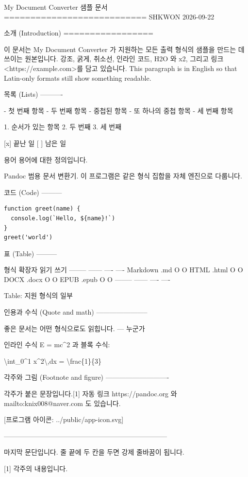 \documentclass[11pt]{article}
\date{}
\begin{document}
My Document Converter 샘플 문서
===========================
SHKWON
2026-09-22

소개 (Introduction)
=================

이 문서는 My Document Converter 가 지원하는 모든 출력 형식의 샘플을 만드는 데 쓰이는 원본입니다. 강조,
굵게, 취소선, 인라인 코드, H2O 와 x2, 그리고 링크 <https://example.com>를 담고 있습니다. This
paragraph is in English so that Latin-only formats still show something
readable.

목록 (Lists)
----------

- 첫 번째 항목
- 두 번째 항목
- 중첩된 항목
- 또 하나의 중첩 항목
- 세 번째 항목

1. 순서가 있는 항목
2. 두 번째
3. 세 번째

[x] 끝난 일
[ ] 남은 일

용어
용어에 대한 정의입니다.

Pandoc
범용 문서 변환기. 이 프로그램은 같은 형식 집합을 자체 엔진으로 다룹니다.

코드 (Code)
---------

\begin{verbatim}
function greet(name) {
  console.log(`Hello, ${name}!`)
}
greet('world')
\end{verbatim}

표 (Table)
---------

형식 확장자 읽기 쓰기
-------- ------ ---- ----
Markdown .md O O
HTML .html O O
DOCX .docx O O
EPUB .epub O O
-------- ------ ---- ----

Table: 지원 형식의 일부

인용과 수식 (Quote and math)
-----------------------

좋은 문서는 어떤 형식으로도 읽힙니다. --- 누군가

인라인 수식 E = mc\^{}2 과 블록 수식:

\textbackslash{}int\_0\^{}1 x\^{}2\textbackslash{},dx =
\textbackslash{}frac\{1\}\{3\}

각주와 그림 (Footnote and figure)
----------------------------

각주가 붙은 문장입니다.[1] 자동 링크 https://pandoc.org 와 mailto:knix008@naver.com 도
있습니다.

[프로그램 아이콘: ../public/app-icon.svg]

------------------------------------------------------------------------

마지막 문단입니다. 줄 끝에 두 칸을 두면
강제 줄바꿈이 됩니다.

[1] 각주의 내용입니다.
\end{document}
